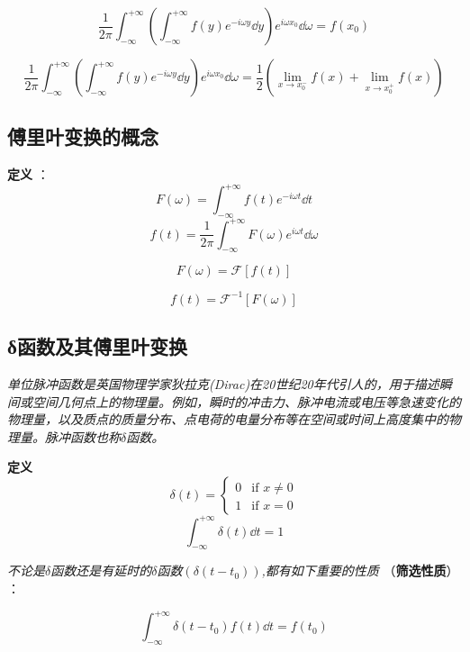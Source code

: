 \qquad \qquad {}

\[\frac{1}{2\pi}\int_{-\infty}^{+\infty}(\int_{-\infty}^{+\infty}f(y)e^{-i\omega y}\dd{y})e^{i\omega x_0}\dd{\omega}=f(x_0)\]

\[\frac{1}{2\pi}\int_{-\infty}^{+\infty}(\int_{-\infty}^{+\infty}f(y)e^{-i\omega y}\dd{y})e^{i\omega x_0}\dd{\omega}=\frac{1}{2}\left ( \lim_{x \rightarrow x_0^-}{f(x)}+\lim_{x \rightarrow x_0^+}{f(x)} \right )\]

\subsection{傅里叶变换的概念}

\textbf{定义}  ：
\[F(\omega)=\int_{-\infty}^{+\infty}f(t)e^{-i\omega t}\dd{t} \tag{1}\] 
\[f(t)=\frac{1}{2\pi}\int_{-\infty}^{+\infty}F(\omega)e^{i\omega t}\dd{\omega} \tag{2}\]

\[F(\omega)=\mathcal{F}[f(t)]\]

\[f(t)=\mathcal{F}^{-1}[F(\omega)]\]

\subsection{δ函数及其傅里叶变换}

\textit{单位脉冲函数是英国物理学家狄拉克(Dirac)在20世纪20年代引人的，用于描述瞬间或空间几何点上的物理量。例如，瞬时的冲击力、脉冲电流或电压等急速变化的物理量，以及质点的质量分布、点电荷的电量分布等在空间或时间上高度集中的物理量。脉冲函数也称$\delta$函数。}

\textbf{定义} \qquad {}
\[\delta(t)=\left\{
\begin{array}{rl}
0 & \text{if } x \neq 0\\
1 & \text{if } x=0
\end{array} \right. \tag{1}\]
\[\int_{-\infty}^{+\infty}\delta(t)\dd{t}=1 \tag{2}\]

\textit{不论是$\delta$函数还是有延时的$\delta$函数$(\delta(t-t_0))$,都有如下重要的性质} （\textbf{筛选性质}） ：

\[\int_{-\infty}^{+\infty}\delta(t-t_0)f(t)\dd{t}=f(t_0) \tag{k}\]

